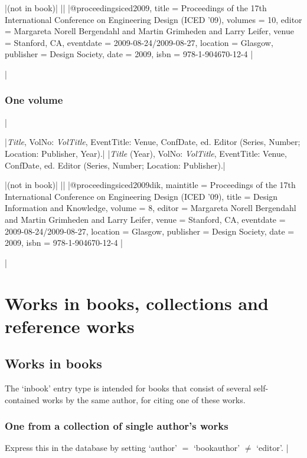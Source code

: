 \documentclass[extrafontsizes,11pt,a4paper,oneside]{memoir}
\newcommand*{\lit}[1]{\textsf{#1}}
\newcommand*{\code}[1]{`\textsf{#1}'}
\begin{document}
\bibexample
|(not in book)|%
||%
|@proceedings{iced2009,
  title = {Proceedings of the 17th International Conference on Engineering Design (ICED ’09)},
  volumes = {10},
  editor = {Margareta Norell Bergendahl and Martin Grimheden and Larry Leifer},
  venue = {Stanford, CA},
  eventdate = {2009-08-24/2009-08-27},
  location = {Glasgow},
  publisher = {Design Society},
  date = {2009},
  isbn = {978-1-904670-12-4}
}|

\todoc|
\subsection{One volume}
|

\specs
|\emph{Title}, VolNo: \emph{VolTitle}, EventTitle: Venue, ConfDate, \lit{ed.} Editor (Series, Number; Location: Publisher, Year).|%
|\emph{Title} (Year), VolNo: \emph{VolTitle}, EventTitle: Venue, ConfDate, \lit{ed.} Editor (Series, Number; Location: Publisher).|

\bibexample
|(not in book)|%
||%
|@proceedings{iced2009dik,
  maintitle = {Proceedings of the 17th International Conference on Engineering Design (ICED ’09)},
  title = {Design Information and Knowledge},
  volume = {8},
  editor = {Margareta Norell Bergendahl and Martin Grimheden and Larry Leifer},
  venue = {Stanford, CA},
  eventdate = {2009-08-24/2009-08-27},
  location = {Glasgow},
  publisher = {Design Society},
  date = {2009},
  isbn = {978-1-904670-12-4}
}|

\todoc|
\chapter{Works in books, collections and reference works}\label{sec:inx}

\section{Works in books}

The \code{inbook} entry type is intended for books that consist of several self-contained works by the same author, for citing one of these works. 

\subsection{One from a collection of single author's works}

Express this in the database by setting \code{author} $=$ \code{bookauthor} $\neq$ \code{editor}.
|
\end{document}
